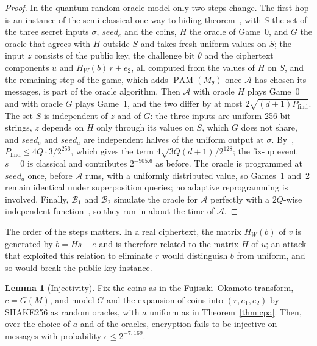 \documentclass[11pt,a4paper]{article}
\theoremstyle{definition}
\newtheorem{lemma}{Lemma}
\newcommand{\PAM}{\operatorname{PAM}}
\begin{document}
\begin{proof}
In the quantum random-oracle model only two steps change. The first hop is an instance of the semi-classical one-way-to-hiding theorem~\cite[Theorem~1]{ahu2019semiclassical}, with $S$ the set of the three secret inputs $\sigma$, $\mathit{seed}_e$ and the coins, $H$ the oracle of Game~0, and $G$ the oracle that agrees with $H$ outside $S$ and takes fresh uniform values on $S$; the input $z$ consists of the public key, the challenge bit $\theta$ and the ciphertext components $u$ and $H_W(b)\,r + e_2$, all computed from the values of $H$ on $S$, and the remaining step of the game, which adds $\PAM(M_\theta)$ once $\mathcal{A}$ has chosen its messages, is part of the oracle algorithm. Then $\mathcal{A}$ with oracle $H$ plays Game~0 and with oracle $G$ plays Game~1, and the two differ by at most $2\sqrt{(d+1)P_{\mathrm{find}}}$. The set $S$ is independent of $z$ and of $G$: the three inputs are uniform 256-bit strings, $z$ depends on $H$ only through its values on $S$, which $G$ does not share, and $\mathit{seed}_e$ and $\mathit{seed}_a$ are independent halves of the uniform output at $\sigma$. By~\cite[Corollary~1]{ahu2019semiclassical}, $P_{\mathrm{find}} \le 4Q \cdot 3/2^{256}$, which gives the term $4\sqrt{3Q(d+1)}/2^{128}$; the fix-up event $s = 0$ is classical and contributes $2^{-905.6}$ as before. The oracle is programmed at $\mathit{seed}_a$ once, before $\mathcal{A}$ runs, with a uniformly distributed value, so Games~1 and~2 remain identical under superposition queries; no adaptive reprogramming is involved. Finally, $\mathcal{B}_1$ and $\mathcal{B}_2$ simulate the oracle for $\mathcal{A}$ perfectly with a $2Q$-wise independent function~\cite{zhandry2012ibe}, so they run in about the time of $\mathcal{A}$.
\end{proof}

The order of the steps matters. In a real ciphertext, the matrix $H_W(b)$ of $v$ is generated by $b = Hs + e$ and is therefore related to the matrix $H$ of $u$; an attack that exploited this relation to eliminate $r$ would distinguish $b$ from uniform, and so would break the public-key instance.

\begin{lemma}[Injectivity]\label{lem:inj}
Fix the coins as in the Fujisaki--Okamoto transform, $c = G(M)$, and model $G$ and the expansion of coins into $(r, e_1, e_2)$ by SHAKE256 as random oracles, with $a$ uniform as in Theorem~\ref{thm:cpa}. Then, over the choice of $a$ and of the oracles, encryption fails to be injective on messages with probability $\epsilon \le 2^{-7{,}169}$.
\end{lemma}
\end{document}
